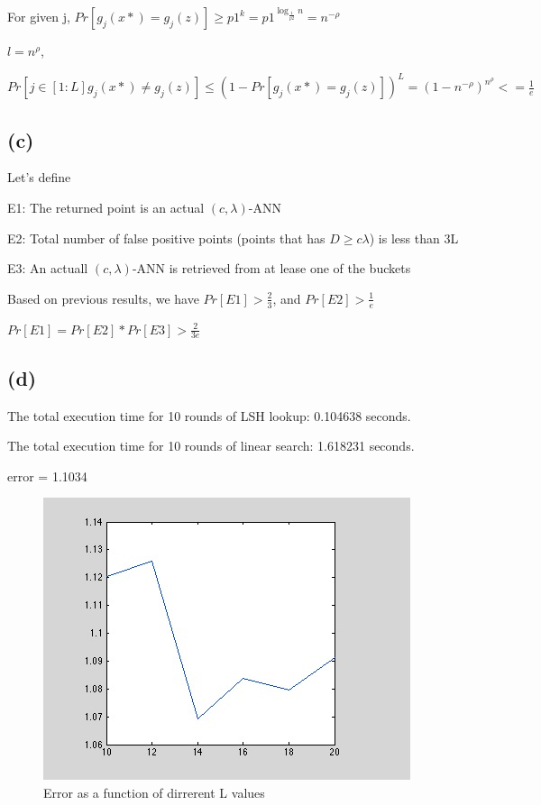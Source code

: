 \documentclass{article}
\begin{document}
For given j, $Pr[g_j(x*) = g_j(z)] \ge p1^k = p1^{\log_\frac{1}{p2} n} = n^{-\rho}$

$l = n^{\rho}$,

$Pr[j \in [1:L] g_j(x*) \ne g_j(z)] \le (1 - Pr[g_j(x*) = g_j(z)])^L = (1 - n^{-\rho})^{n^{\rho}} <= \frac{1}{e}$

\subsection{(c)}

Let's define

E1: The returned point is an actual $(c,\lambda)$-ANN

E2: Total number of false positive points (points that has $D \ge c\lambda$) is less than 3L

E3: An actuall $(c,\lambda)$-ANN is retrieved from at lease one of the buckets

Based on previous results, we have $Pr[E1] > \frac{2}{3}$, and $Pr[E2] > \frac{1}{e}$

$Pr[E1] = Pr[E2] * Pr[E3] > \frac{2}{3e}$


\subsection{(d)}

The total execution time for 10 rounds of LSH lookup: 0.104638 seconds.

The total execution time for 10 rounds of linear search: 1.618231 seconds.

error = 1.1034

\begin{figure}
\centering
\includegraphics[scale=0.5]{lsh/errs_l.png}
\caption{Error as a function of dirrerent L values}
\label{threadsVsSync}
\end{figure}
\end{document}
